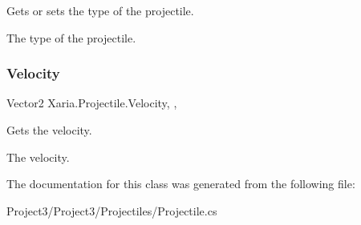 Gets or sets the type of the projectile. 

The type of the projectile. \mbox{\label{classXaria_1_1Projectile_a5783afe0045a081c6d285cf6801eb983}} 
\subsubsection{\texorpdfstring{Velocity}{Velocity}}
{\footnotesize\ttfamily Vector2 Xaria.\+Projectile.\+Velocity\hspace{0.3cm}{\ttfamily [get]}, {\ttfamily [set]}, {\ttfamily [protected]}}



Gets the velocity. 

The velocity. 

The documentation for this class was generated from the following file\+:\begin{DoxyCompactItemize}
\item 
Project3/\+Project3/\+Projectiles/Projectile.\+cs\end{DoxyCompactItemize}
